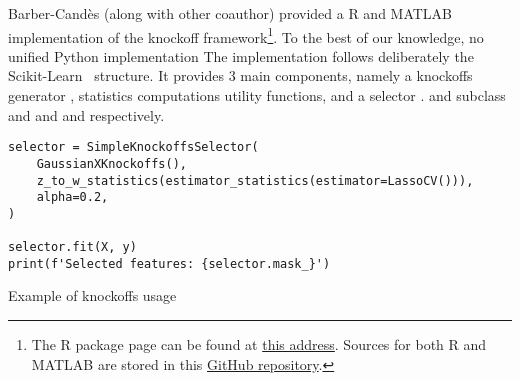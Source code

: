 Barber-Candès (along with other coauthor) provided a R and MATLAB implementation
of the knockoff framework\footnote{
    The R package page can be found at
    \href{https://cran.r-project.org/web/packages/knockoff/index.html}{this address}.
    Sources for both R and MATLAB are stored in this
    \href{https://github.com/msesia/knockoff-filter}{GitHub repository}.
}.
To the best of our knowledge, no unified Python implementation
The implementation follows deliberately the Scikit-Learn~\cite{sklearn} structure.
It provides 3 main components,
namely a knockoffs generator ,
statistics computations utility functions,
and a selector .
 and  subclass  and 
and  and  respectively.

\begin{calgorithm}
\begin{verbatim}
selector = SimpleKnockoffsSelector(
    GaussianXKnockoffs(),
    z_to_w_statistics(estimator_statistics(estimator=LassoCV())),
    alpha=0.2,
)

selector.fit(X, y)
print(f'Selected features: {selector.mask_}')
\end{verbatim}
\caption{
    Example of knockoffs usage
}\label{code:python_knockoffs}
\end{calgorithm}
